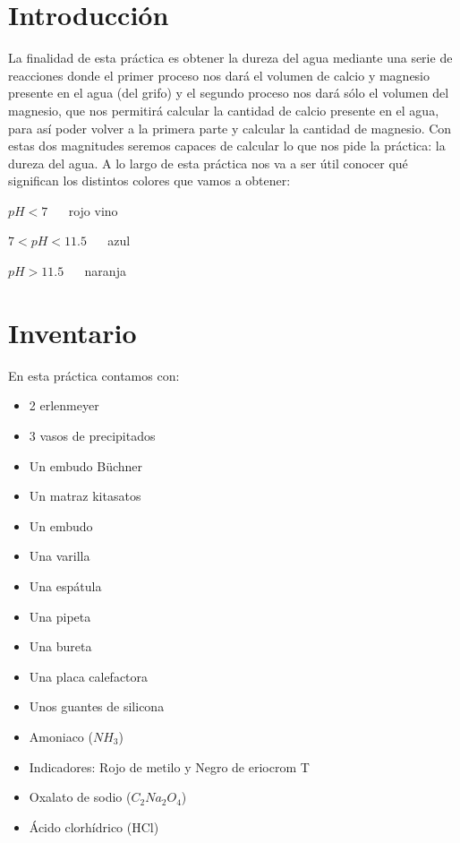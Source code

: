 \section{Introducción}   %
\noindent La finalidad de esta práctica es obtener la dureza del agua mediante una serie de reacciones donde el primer proceso nos dará el volumen de calcio y magnesio presente en el agua (del grifo) y el segundo proceso nos dará sólo el volumen del magnesio, que nos permitirá calcular la cantidad de calcio presente en el agua, para así poder volver a la primera parte y calcular la cantidad de magnesio. Con estas dos magnitudes seremos capaces de calcular lo que nos pide la práctica: la dureza del agua. A lo largo de esta práctica nos va a ser útil conocer qué significan los distintos colores que vamos a obtener:

\begin{multicols}{3}
    $pH < 7$ ~\rightsquigarrow ~ rojo vino
    
    \vspace{0.1cm}
    
    $7 < pH < 11.5$ ~\rightsquigarrow ~ azul
    
    \vspace{0.1cm}
    
    $pH > 11.5$ ~\rightsquigarrow ~ naranja
\end{multicols}

\section{Inventario}  
\noindent En esta práctica contamos con:
\begin{multicols}{2}
    \begin{itemize}
        \item 2 erlenmeyer
        \item 3 vasos de precipitados
        \item Un embudo Büchner
        \item Un matraz kitasatos
        \item Un embudo
        \item Una varilla
        \item Una espátula
        \item Una pipeta 
        \item Una bureta
        \item Una placa calefactora
        \item Unos guantes de silicona
        \item Amoniaco ($NH_3$)
        \item Indicadores: Rojo de metilo y Negro de eriocrom T
        \item Oxalato de sodio ($C_2Na_2O_4$)
        \item Ácido clorhídrico (HCl)
    \end{itemize}
\end{multicols}

